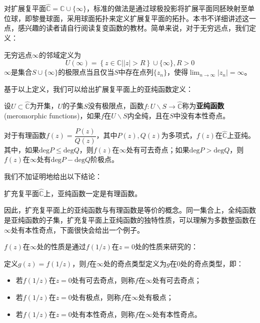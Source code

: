 对扩展复平面$\hat{\mathbb{C}}=\mathbb{C}\cup\{\infty\}$，标准的做法是通过球极投影将扩展平面同胚映射至单位球，即黎曼球面，采用球面拓扑来定义扩展复平面的拓扑。本书不详细讲述这一点，感兴趣的读者请自行阅读复变函数的教材。简单来说，对于无穷远点，我们定义：
\begin{definition}[无穷远点的邻域]
    无穷远点$\infty$的邻域定义为
    \[U(\infty)=\left\{\left.z\in\mathbb{C} \right||z|>R\right\}\cup\{\infty\},R>0\]
    $\infty$是集合$S\cup\{\infty\}$的极限点当且仅当$S$中存在点列$\{z_n\}$，使得$\lim_{n\to\infty}|z_n|=\infty$。
\end{definition}
基于以上定义，我们可以给出扩展复平面上的亚纯函数定义：
\begin{definition}[扩展复平面上的亚纯函数]
    设$U\subset\hat{\mathbb{C}}$为开集，$U$的子集$S$没有极限点，函数$f:U\backslash S\to\hat{\mathbb{C}}$称为\textbf{亚纯函数}(meromorphic functions)，如果$f$在$U\backslash S$内全纯，且在$S$中没有本性奇点。
\end{definition}
\begin{example}
    对于有理函数$f(z)=\dfrac{P(z)}{Q(z)}$，其中$P(z),Q(z)$为多项式，$f(z)$在$\hat{\mathbb{C}}$上亚纯。其中，如果$\text{deg}P\leq\text{deg}Q$，则$f(z)$在$\infty$处有可去奇点；如果$\text{deg}P>\text{deg}Q$，则$f(z)$在$\infty$处有$\text{deg}P-\text{deg}Q$阶极点。
\end{example}
我们不加证明地给出以下结论\cite{Function_Theory}：
\begin{claim}
    扩充复平面$\hat{\mathbb{C}}$上，亚纯函数一定是有理函数。
\end{claim}
因此，扩充复平面上的亚纯函数与有理函数是等价的概念。同一集合上，全纯函数是亚纯函数的子集，扩充复平面上亚纯函数的独特性质，可以理解为多数整函数在$\infty$处有本性奇点，下面很快会给出一个例子。

$f(z)$在$\infty$处的性质是通过$f(1/z)$在$z=0$处的性质来研究的：
\begin{definition}[无穷远点的奇点类型]
    定义$g(z)=f(1/z)$，则$f$在$\infty$处的奇点类型定义为$g$在$0$处的奇点类型，即：
    \begin{itemize}
        \item 若$f(1/z)$在$z=0$处有可去奇点，则称$f$在$\infty$处有可去奇点；
        \item 若$f(1/z)$在$z=0$处有极点，则称$f$在$\infty$处有极点；
        \item 若$f(1/z)$在$z=0$处有本性奇点，则称$f$在$\infty$处有本性奇点。
    \end{itemize}
\end{definition}


